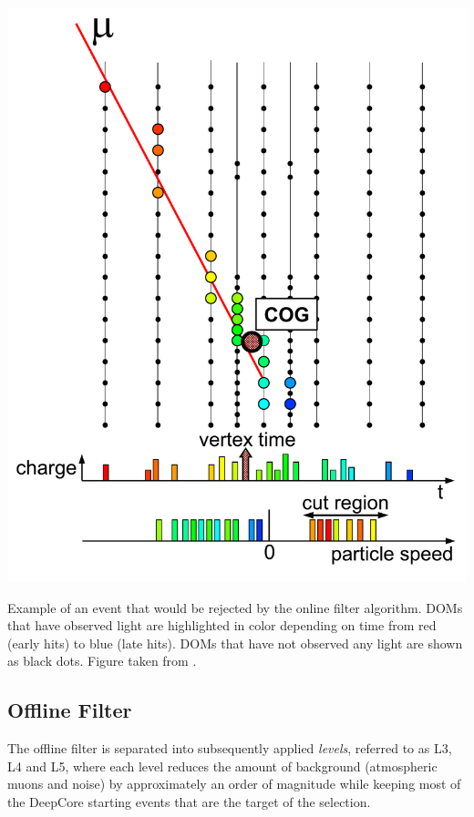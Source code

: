 \begin{marginfigure}
    \includegraphics[width=\textwidth]{figures/icecube/eventviews/FilterDiagram.pdf}
    \caption{Example of an event that would be rejected by the online filter algorithm. DOMs that have observed light are highlighted in color depending on time from red (early hits) to blue (late hits). DOMs that have not observed any light are shown as black dots. Figure taken from \cite{DeepCore}.}
    \label{fig:online-filter-event}
\end{marginfigure}

\subsection{Offline Filter}
\label{sec:offline-filter}
The offline filter is separated into subsequently applied \emph{levels}, referred to as L3, L4 and L5, where each level reduces the amount of background (atmospheric muons and noise) by approximately an order of magnitude while keeping most of the DeepCore starting events that are the target of the selection.


